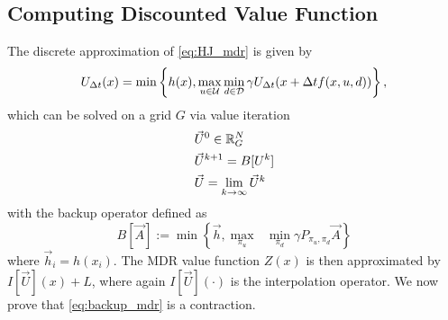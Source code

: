 %


%





\subsection{Computing Discounted Value Function}
The discrete approximation of \eqref{eq:HJ_mdr} is given by
%
\begin{equation}\label{eq:U_approx}
    U_{\Delta t} (x) = \min\left\{h(x), \max_{u\in\mathcal{U}} \min_{ d\in\mathcal{D}}  \gamma U_{\Delta t}(x+\Delta tf(x,u,d))\right\},
\end{equation}%
\noindent which can be solved on a grid $G$ via value iteration 
%
\begin{subequations} \label{eq:val_iter_backup}
\begin{align}
&\vec{U}^{0} \in \mathbb{R}^N_G\\
&\vec{U}^{k+1} = B[U^k]\\
&\vec{U} = \lim_{k\rightarrow \infty} \vec{U}^{k}
\end{align}
\end{subequations}%
\noindent with the backup operator defined as
%
\begin{equation} \label{eq:backup_mdr}
B[\vec{A}] := \min\left\{ \vec{h}, \underset{\pi_u}{\max}\text{ }\underset{ \pi_d}{\min} \gamma P_{\pi_u, \pi_d} \vec{A} \right \}
\end{equation}%
\noindent where $\vec{h}_i = h(x_i)$. The MDR value function $Z(x)$ is then approximated by $I[\vec{U}](x)+L$, where again $I[\vec{U}](\cdot)$ is the interpolation operator. We now prove that \eqref{eq:backup_mdr} is a contraction.

